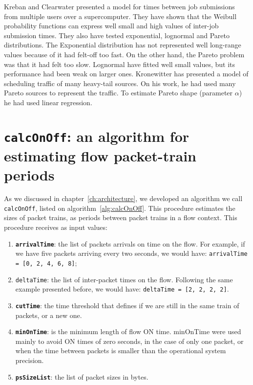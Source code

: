 Kreban and Clearwater\cite{hierarchical-dynamics-interarrival-times}  presented a model for times between job submissions from multiple users over a supercomputer. They have shown that the Weibull probability functions can express well small and high values of inter-job submission times. They also have tested exponential, lognormal and Pareto distributions. The Exponential distribution has not represented well long-range values because of it had felt-off too fast. On the other hand, the Pareto problem was that it had felt too slow. Lognormal have fitted well small values, but its performance had been weak on larger ones. Kronewitter\cite{optimal-scheduling-of-heavy-tailed-traffic} has presented a model of scheduling traffic of many heavy-tail sources. On his work, he had used many Pareto sources to represent the traffic. To estimate Pareto shape (parameter $\alpha$) he had used linear regression.



\section{\texttt{calcOnOff}: an algorithm for estimating flow packet-train periods}


As we discussed in chapter~\ref{ch:architecture},  we developed an algorithm we call \texttt{calcOnOff}, listed on algorithm~\ref{alg:calcOnOff}. This procedure estimates the sizes of packet trains, as periods between packet trains in a flow context. 
This procedure receives as input values:

\begin{enumerate}
\item  \textbf{\texttt{arrivalTime}}: the list of packets arrivals on time on the flow. For example, if we have five packets arriving every two seconds, we would have: \texttt{arrivalTime = [0, 2, 4,  6, 8]};
\item  \texttt{deltaTime}: the list of inter-packet times on the flow. Following the same example presented before, we would have: \texttt{deltaTime = [2, 2, 2, 2]}. 
\item  \textbf{\texttt{cutTime}}: the time threshold that defines if we are still in the same train of packets, or a new one. 
\item  \textbf{\texttt{minOnTime}}: is the minimum length of flow ON time. minOnTime were used mainly to avoid ON times of zero seconds, in the case of only one packet, or when the time between packets is smaller than the operational system precision. 
\item  \textbf{\texttt{psSizeList}}: the list of packet sizes in bytes. 
\end{enumerate}



